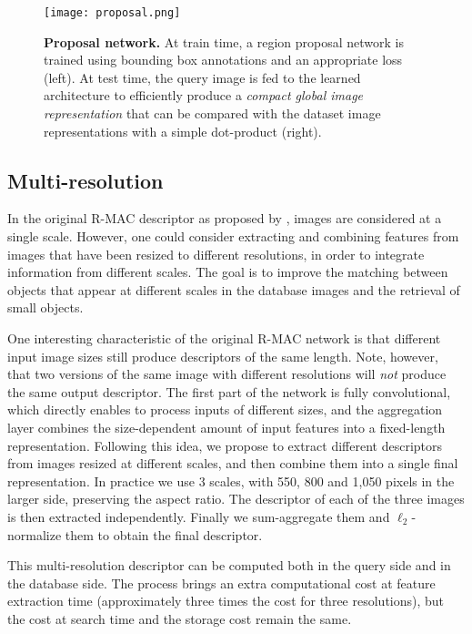 \documentclass[twocolumn]{svjour3}          \smartqed  \usepackage{graphicx}
\begin{document}
\begin{figure*}[th!]
\texttt{[image: proposal.png]}
\caption{\textbf{Proposal network.} 
At train time, a region proposal network is trained using bounding box annotations and an appropriate loss (left). At test time, the query image is fed to the learned architecture to
efficiently produce a \textit{compact global image representation} that can be compared with the dataset image representations with a
simple dot-product (right). \label{fig:rpn}}
\end{figure*}

\subsection{Multi-resolution}
\label{sec:multi-res}



In the original R-MAC descriptor as proposed by \cite{Tolias2016}, images are considered at a single scale. However, one could consider extracting and combining features from images that have been resized to different resolutions, in order to integrate information from different scales. The goal is to improve the matching between objects that appear at different scales in the database images and the retrieval of small objects.

One interesting characteristic of the original R-MAC network is that different input image sizes still produce descriptors of the same length. Note, however, that two versions of the same image with different resolutions will \emph{not} produce the same output descriptor. The first part of the network is fully convolutional, which directly enables to process inputs of different sizes, and the aggregation layer combines the size-dependent amount of input features into a fixed-length representation. Following this idea, we propose to extract different descriptors from images resized at different scales, and then combine them into a single final representation. 
In practice we use 3 scales, with 550, 800 and 1,050 pixels in the larger side, preserving the aspect ratio. The descriptor of each of the three images is then extracted independently. Finally we sum-aggregate them and $\ell_2$-normalize them to obtain the final descriptor.

This multi-resolution descriptor can be computed both in the query side and in the database side.
The process brings an extra computational cost at feature extraction time (approximately three times the cost for three resolutions), but the cost at search time and the storage cost remain the same.
\end{document}
